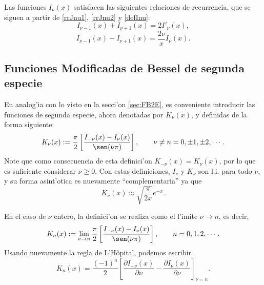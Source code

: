 Las funciones $I_\nu(x)$ satisfacen las siguientes relaciones de recurrencia, que se siguen a partir de \eqref{rrJnu1}, \eqref{rrJnu2} y \eqref{defInu}:
\begin{equation}\label{rrInu1}
I_{\nu-1}(x)+I_{\nu+1}(x)=2I'_\nu(x),
\end{equation}
\begin{equation}\label{rrInu2}
I_{\nu-1}(x)-I_{\nu+1}(x)=\frac{2\nu}{x}I_\nu(x).
\end{equation}

\subsection{Funciones Modificadas de Bessel de segunda especie}
En analog'ia con lo visto en la secci'on \ref{sec:FB2E}, es conveniente introducir las funciones de segunda especie, ahora denotadas por $K_\nu(x)$, y definidas de la forma siguiente:
\begin{equation}\label{defKnu}
K_\nu(x) := \frac{\pi}{2}\left[\frac{I_{-\nu}(x)-I_\nu(x)}{\sen(\nu\pi)}\right], \qquad \nu\neq n=0,\pm 1,\pm 2, \cdots.
\end{equation}
Note que como consecuencia de esta definici'on $K_{-\nu}(x)=K_\nu(x)$, por lo que es suficiente considerar $\nu\ge 0$.
Con estas definiciones, $I_\nu$ y $K_\nu$ son l.i. para todo $\nu$, y su forma asint'otica es nuevamente ``complementaria'' ya que
\begin{equation}
K_\nu(x) \approx \sqrt{\frac{\pi}{2x}} e^{-x}.
\end{equation}

En el caso de $\nu$ entero, la definici'on se realiza como el l'imite $\nu\to n$, es decir,
\begin{equation}
K_n(x) := \lim_{\nu\to n}\frac{\pi}{2}\left[\frac{I_{-\nu}(x)-I_\nu(x)}{\sen(\nu\pi)}\right], \qquad  n=0,1,2, \cdots.
\end{equation}
Usando nuevamente la regla de L'H\^opital, podemos escribir
\begin{equation}\label{Knder}
K_n(x)=\frac{(-1)^n}{2}\left[\frac{\partial I_{-\nu}(x)}{\partial\nu}-\frac{\partial I_\nu(x)}{\partial\nu}\right]_{\nu=n}.
\end{equation}


